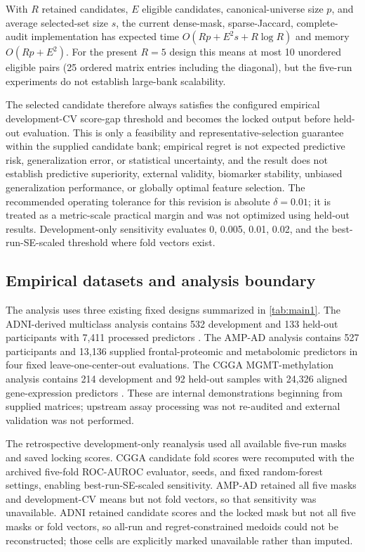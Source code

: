 With \(R\) retained candidates, \(E\) eligible candidates, canonical-universe size \(p\), and average selected-set size \(s\), the current dense-mask, sparse-Jaccard, complete-audit implementation has expected time \(O(Rp+E^2s+R\log R)\) and memory \(O(Rp+E^2)\). For the present \(R=5\) design this means at most 10 unordered eligible pairs (25 ordered matrix entries including the diagonal), but the five-run experiments do not establish large-bank scalability.

The selected candidate therefore always satisfies the configured empirical development-CV score-gap threshold and becomes the locked output before held-out evaluation. This is only a feasibility and representative-selection guarantee within the supplied candidate bank; empirical regret is not expected predictive risk, generalization error, or statistical uncertainty, and the result does not establish predictive superiority, external validity, biomarker stability, unbiased generalization performance, or globally optimal feature selection. The recommended operating tolerance for this revision is absolute \(\delta=0.01\); it is treated as a metric-scale practical margin and was not optimized using held-out results. Development-only sensitivity evaluates 0, 0.005, 0.01, 0.02, and the best-run-SE-scaled threshold where fold vectors exist.



\subsection{Empirical datasets and analysis boundary}

The analysis uses three existing fixed designs summarized in \cref{tab:main1}. The ADNI-derived multiclass analysis contains 532 development and 133 held-out participants with 7,411 processed predictors \citep{ref20,ref21}. The AMP-AD analysis contains 527 participants and 13,136 supplied frontal-proteomic and metabolomic predictors in four fixed leave-one-center-out evaluations. The CGGA MGMT-methylation analysis contains 214 development and 92 held-out samples with 24,326 aligned gene-expression predictors \citep{ref23}. These are internal demonstrations beginning from supplied matrices; upstream assay processing was not re-audited and external validation was not performed.



The retrospective development-only reanalysis used all available five-run masks and saved locking scores. CGGA candidate fold scores were recomputed with the archived five-fold ROC-AUROC evaluator, seeds, and fixed random-forest settings, enabling best-run-SE-scaled sensitivity. AMP-AD retained all five masks and development-CV means but not fold vectors, so that sensitivity was unavailable. ADNI retained candidate scores and the locked mask but not all five masks or fold vectors, so all-run and regret-constrained medoids could not be reconstructed; those cells are explicitly marked unavailable rather than imputed.

